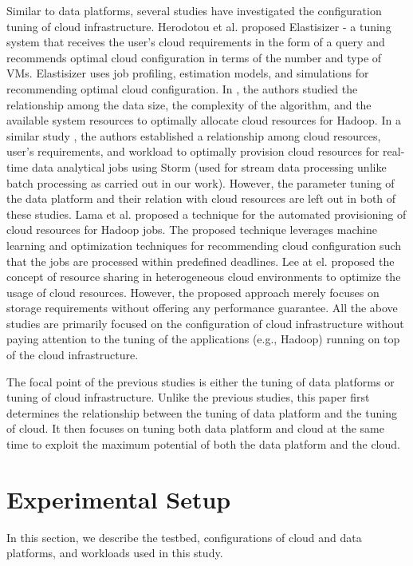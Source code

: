 \documentclass[3p]{elsarticle}
\begin{document}
Similar to data platforms, several studies have investigated the configuration tuning of cloud infrastructure. Herodotou et al. \cite{herodotou2011no} proposed Elastisizer - a tuning system that receives the user's cloud requirements in the form of a query and recommends optimal cloud configuration in terms of the number and type of VMs. Elastisizer uses job profiling, estimation models, and simulations for recommending optimal cloud configuration. In \cite{chen2013cresp}, the authors studied the relationship among the data size, the complexity of the algorithm, and the available system resources to optimally allocate cloud resources for Hadoop.  In a similar study \cite{fu2015drs}, the authors established a relationship among cloud resources, user's requirements, and workload to optimally provision cloud resources for real-time data analytical jobs using Storm (used for stream data processing unlike batch processing as carried out in our work). However, the parameter tuning of the data platform and their relation with cloud resources are left out in both of these studies. Lama et al. \cite{lama2012aroma} proposed a technique for the automated provisioning of cloud resources for Hadoop jobs. The proposed technique leverages machine learning and optimization techniques for recommending cloud configuration such that the jobs are processed within predefined deadlines. Lee at el. \cite{lee2011heterogeneity} proposed the concept of resource sharing in heterogeneous cloud environments to optimize the usage of cloud resources. However, the proposed approach merely focuses on storage requirements without offering any performance guarantee. All the above studies are primarily focused on the configuration of cloud infrastructure without paying attention to the tuning of the applications (e.g., Hadoop) running on top of the cloud infrastructure. 

The focal point of the previous studies is either the tuning of data platforms or tuning of cloud infrastructure. Unlike the previous studies, this paper first determines the relationship between the tuning of data platform and the tuning of cloud. It then focuses on tuning both data platform and cloud at the same time to exploit the maximum potential of both the data platform and the cloud.


\section{Experimental Setup}\label{experimental_setup}
In this section, we describe the testbed, configurations of cloud and data platforms, and workloads used in this study. 
\end{document}

